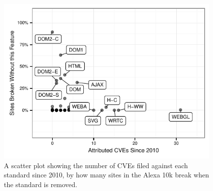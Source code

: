 \begin{figure}[th]
  \centering
  \includegraphics[width=.5\textwidth]{figures/cve_breakrate.pdf}
  \caption{A scatter plot showing the number of CVEs filed against each standard since 2010, by how many sites in the Alexa 10k break when the standard is removed.}
  \label{fig:cve-breakrate}
\end{figure}
